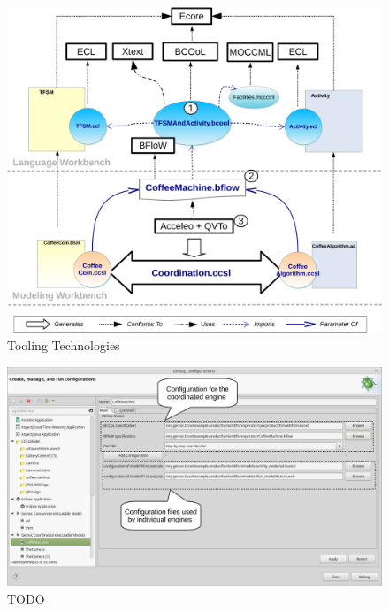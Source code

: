 \begin{figure}
		\begin{center}
			\includegraphics[width=1\textwidth]{bcool/figs/bcooltechnos}
			\caption{\bcool Tooling Technologies}
			\label{fig:bcooltechnos}
		\end{center}
\end{figure}


\begin{figure}
	\begin{center}
		\includegraphics[width=.8\textwidth]{bcool/figs/execenginemenu}
		\caption{TODO}
		\label{fig:execenginemenu}
	\end{center}
\end{figure}


